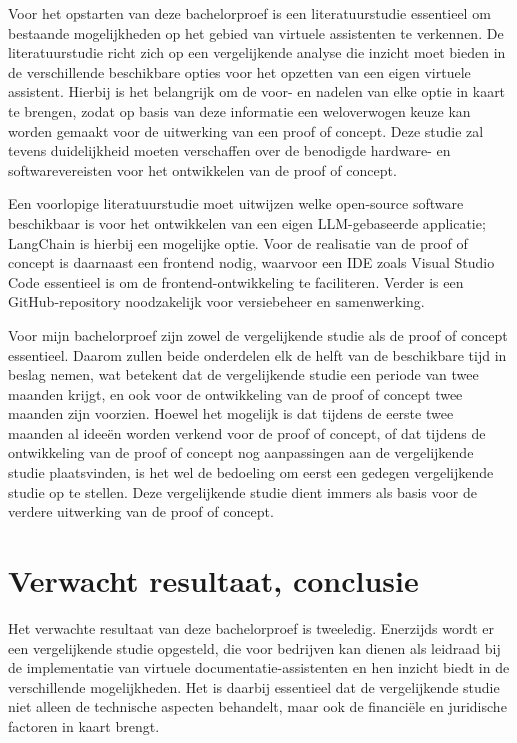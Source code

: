 Voor het opstarten van deze bachelorproef is een literatuurstudie essentieel om bestaande mogelijkheden op het gebied van virtuele assistenten te verkennen. De literatuurstudie richt zich op een vergelijkende analyse die inzicht moet bieden in de verschillende beschikbare opties voor het opzetten van een eigen virtuele assistent. Hierbij is het belangrijk om de voor- en nadelen van elke optie in kaart te brengen, zodat op basis van deze informatie een weloverwogen keuze kan worden gemaakt voor de uitwerking van een proof of concept. Deze studie zal tevens duidelijkheid moeten verschaffen over de benodigde hardware- en softwarevereisten voor het ontwikkelen van de proof of concept.

Een voorlopige literatuurstudie moet uitwijzen welke open-source software beschikbaar is voor het ontwikkelen van een eigen LLM-gebaseerde applicatie; LangChain is hierbij een mogelijke optie. Voor de realisatie van de proof of concept is daarnaast een frontend nodig, waarvoor een IDE zoals Visual Studio Code essentieel is om de frontend-ontwikkeling te faciliteren. Verder is een GitHub-repository noodzakelijk voor versiebeheer en samenwerking.

Voor mijn bachelorproef zijn zowel de vergelijkende studie als de proof of concept essentieel. Daarom zullen beide onderdelen elk de helft van de beschikbare tijd in beslag nemen, wat betekent dat de vergelijkende studie een periode van twee maanden krijgt, en ook voor de ontwikkeling van de proof of concept twee maanden zijn voorzien. Hoewel het mogelijk is dat tijdens de eerste twee maanden al ideeën worden verkend voor de proof of concept, of dat tijdens de ontwikkeling van de proof of concept nog aanpassingen aan de vergelijkende studie plaatsvinden, is het wel de bedoeling om eerst een gedegen vergelijkende studie op te stellen. Deze vergelijkende studie dient immers als basis voor de verdere uitwerking van de proof of concept.

\section{Verwacht resultaat, conclusie}%
\label{sec:verwachte_resultaten}

Het verwachte resultaat van deze bachelorproef is tweeledig. Enerzijds wordt er een vergelijkende studie opgesteld, die voor bedrijven kan dienen als leidraad bij de implementatie van virtuele documentatie-assistenten en hen inzicht biedt in de verschillende mogelijkheden. Het is daarbij essentieel dat de vergelijkende studie niet alleen de technische aspecten behandelt, maar ook de financiële en juridische factoren in kaart brengt.

